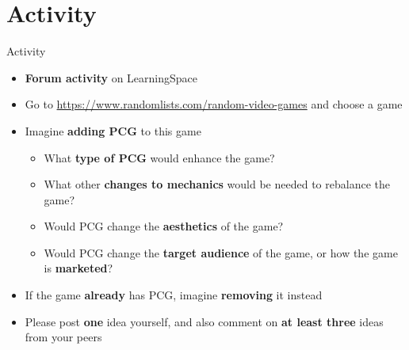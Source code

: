 \part{Activity}
\frame{\partpage}

\begin{frame}{Activity}
	\begin{itemize}
		\item \textbf{Forum activity} on LearningSpace
		\item Go to {\footnotesize\url{https://www.randomlists.com/random-video-games}} and choose a game
		\item Imagine \textbf{adding PCG} to this game
			\begin{itemize}
				\item What \textbf{type of PCG} would enhance the game?
				\item What other \textbf{changes to mechanics} would be needed to rebalance the game?
				\item Would PCG change the \textbf{aesthetics} of the game?
				\item Would PCG change the \textbf{target audience} of the game, or how the game is \textbf{marketed}?
			\end{itemize}
		\item If the game \textbf{already} has PCG, imagine \textbf{removing} it instead
		\item Please post \textbf{one} idea yourself, and also comment on \textbf{at least three} ideas from your peers
	\end{itemize}
\end{frame}
